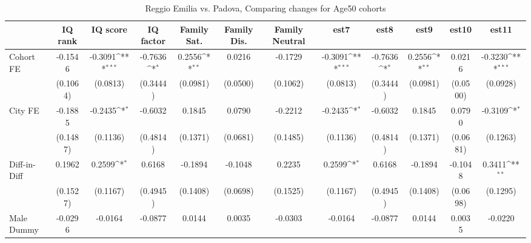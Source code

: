 \begin{table}[htbp]\centering
\def\sym#1{\ifmmode^{#1}\else\(^{#1}\)\fi}
\caption{Reggio Emilia vs. Padova, Comparing changes for Age50 cohorts}
\begin{tabular}{l*{11}{c}}
\toprule
            &\multicolumn{1}{c}{IQ rank}&\multicolumn{1}{c}{IQ score}&\multicolumn{1}{c}{IQ factor}&\multicolumn{1}{c}{Family Sat.}&\multicolumn{1}{c}{Family Dis.}&\multicolumn{1}{c}{Family Neutral}&\multicolumn{1}{c}{est7}&\multicolumn{1}{c}{est8}&\multicolumn{1}{c}{est9}&\multicolumn{1}{c}{est10}&\multicolumn{1}{c}{est11}\\
\midrule
Cohort FE   &     -0.1546         &     -0.3091\sym{***}&     -0.7636\sym{*}  &      0.2556\sym{**} &      0.0216         &     -0.1729         &     -0.3091\sym{***}&     -0.7636\sym{*}  &      0.2556\sym{**} &      0.0216         &     -0.3230\sym{***}\\
            &    (0.1064)         &    (0.0813)         &    (0.3444)         &    (0.0981)         &    (0.0500)         &    (0.1062)         &    (0.0813)         &    (0.3444)         &    (0.0981)         &    (0.0500)         &    (0.0928)         \\
\addlinespace
City FE     &     -0.1885         &     -0.2435\sym{*}  &     -0.6032         &      0.1845         &      0.0790         &     -0.2212         &     -0.2435\sym{*}  &     -0.6032         &      0.1845         &      0.0790         &     -0.3109\sym{*}  \\
            &    (0.1487)         &    (0.1136)         &    (0.4814)         &    (0.1371)         &    (0.0681)         &    (0.1485)         &    (0.1136)         &    (0.4814)         &    (0.1371)         &    (0.0681)         &    (0.1263)         \\
\addlinespace
Diff-in-Diff&      0.1962         &      0.2599\sym{*}  &      0.6168         &     -0.1894         &     -0.1048         &      0.2235         &      0.2599\sym{*}  &      0.6168         &     -0.1894         &     -0.1048         &      0.3411\sym{**} \\
            &    (0.1527)         &    (0.1167)         &    (0.4945)         &    (0.1408)         &    (0.0698)         &    (0.1525)         &    (0.1167)         &    (0.4945)         &    (0.1408)         &    (0.0698)         &    (0.1295)         \\
\addlinespace
Male Dummy  &     -0.0296         &     -0.0164         &     -0.0877         &      0.0144         &      0.0035         &     -0.0303         &     -0.0164         &     -0.0877         &      0.0144         &      0.0035         &     -0.0220         \\

\end{tabular}
\end{table}

